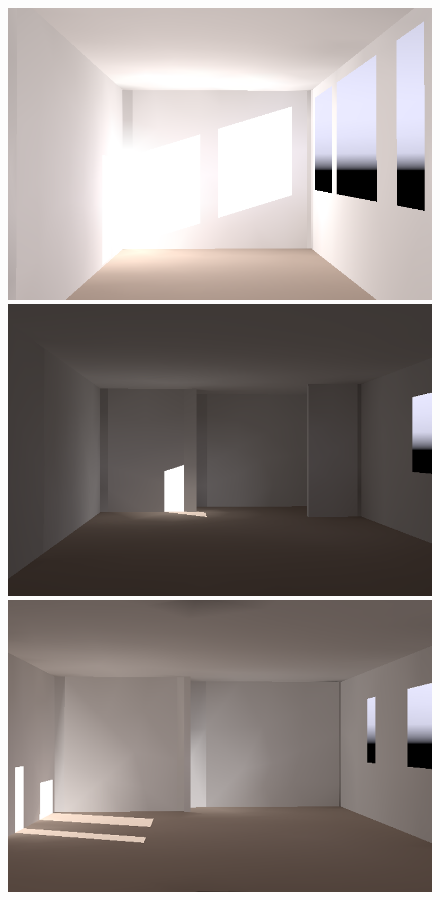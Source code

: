 \begin{figure}[t]
\includegraphics[width=\figwidth]{p3r_031_camera_dark_december_mod_crop.png} %
\hfill
\includegraphics[width=\figwidth]{p3r_063_camera_dark_december_crop.png} %
\includegraphics[width=\figwidth]{p3r_063-2_camera_dark_december_mod_crop.png} %


\end{figure}
